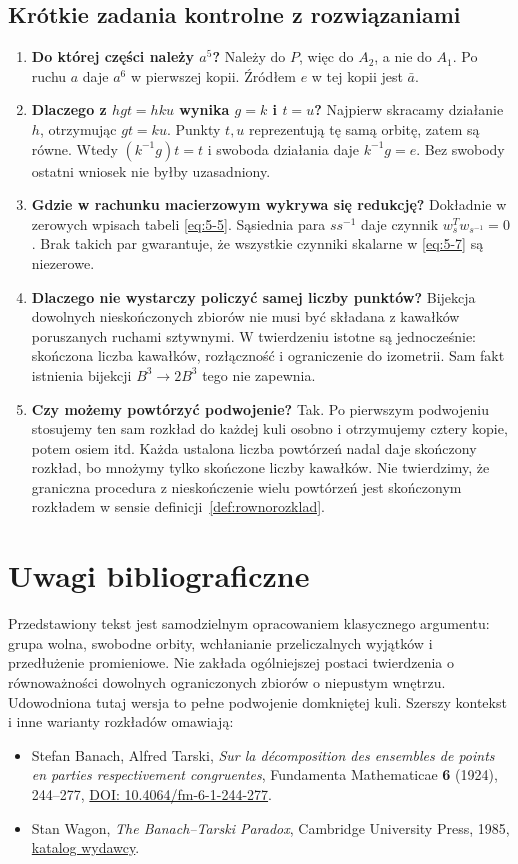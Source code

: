 \documentclass[11pt,a4paper]{article}
\numberwithin{equation}{section}
\theoremstyle{plain}
\theoremstyle{definition}
\theoremstyle{remark}
\begin{document}
\subsection{Krótkie zadania kontrolne z rozwiązaniami}
\begin{enumerate}
\item \textbf{Do której części należy $a^5$?} Należy do $P$, więc do $A_2$, a nie do $A_1$. Po ruchu $a$ daje $a^6$ w pierwszej kopii. Źródłem $e$ w tej kopii jest $\bar a$.
\item \textbf{Dlaczego z $hgt=hku$ wynika $g=k$ i $t=u$?} Najpierw skracamy działanie $h$, otrzymując $gt=ku$. Punkty $t,u$ reprezentują tę samą orbitę, zatem są równe. Wtedy $(k^{-1}g)t=t$ i swoboda działania daje $k^{-1}g=e$. Bez swobody ostatni wniosek nie byłby uzasadniony.
\item \textbf{Gdzie w rachunku macierzowym wykrywa się redukcję?} Dokładnie w zerowych wpisach tabeli \eqref{eq:5-5}. Sąsiednia para $ss^{-1}$ daje czynnik $w_s^Tw_{s^{-1}}=0$. Brak takich par gwarantuje, że wszystkie czynniki skalarne w \eqref{eq:5-7} są niezerowe.
\item \textbf{Dlaczego nie wystarczy policzyć samej liczby punktów?} Bijekcja dowolnych nieskończonych zbiorów nie musi być składana z kawałków poruszanych ruchami sztywnymi. W twierdzeniu istotne są jednocześnie: skończona liczba kawałków, rozłączność i ograniczenie do izometrii. Sam fakt istnienia bijekcji $B^3\to2B^3$ tego nie zapewnia.
\item \textbf{Czy możemy powtórzyć podwojenie?} Tak. Po pierwszym podwojeniu stosujemy ten sam rozkład do każdej kuli osobno i otrzymujemy cztery kopie, potem osiem itd. Każda ustalona liczba powtórzeń nadal daje skończony rozkład, bo mnożymy tylko skończone liczby kawałków. Nie twierdzimy, że graniczna procedura z nieskończenie wielu powtórzeń jest skończonym rozkładem w sensie definicji~\ref{def:rownorozklad}.
\end{enumerate}

\section*{Uwagi bibliograficzne}
Przedstawiony tekst jest samodzielnym opracowaniem klasycznego argumentu: grupa wolna, swobodne orbity, wchłanianie przeliczalnych wyjątków i przedłużenie promieniowe. Nie zakłada ogólniejszej postaci twierdzenia o równoważności dowolnych ograniczonych zbiorów o niepustym wnętrzu. Udowodniona tutaj wersja to pełne podwojenie domkniętej kuli. Szerszy kontekst i inne warianty rozkładów omawiają:
\begin{itemize}
\item Stefan Banach, Alfred Tarski, \emph{Sur la décomposition des ensembles de points en parties respectivement congruentes}, Fundamenta Mathematicae \textbf{6} (1924), 244--277, \href{https://doi.org/10.4064/fm-6-1-244-277}{DOI: 10.4064/fm-6-1-244-277}.
\item Stan Wagon, \emph{The Banach--Tarski Paradox}, Cambridge University Press, 1985, \href{https://www.cambridge.org/core/books/the-banach-tarski-paradox/EA35091E69D798AE0FAE5A4E8386DD08}{katalog wydawcy}.
\end{itemize}
\end{document}
